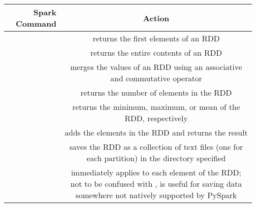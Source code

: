 \begin{table}[H]
\begin{tabular}{|r|C|}
\hline
\textbf{Spark Command} & \textbf{Action} \\
\hline
{} & returns the first  elements of an RDD \\
\hline
{} & returns the entire contents of an RDD \\
\hline
{} & merges the values of an RDD using an associative and commutative operator  \\
\hline
{} & returns the number of elements in the RDD \\
\hline
{} & returns the minimum, maximum, or mean of the RDD, respectively \\
\hline
{} & adds the elements in the RDD and returns the result \\
\hline
{} & saves the RDD as a collection of text files (one for each partition) in the directory specified \\
\hline
{} & immediately applies  to each element of the RDD; not to be confused with ,  is useful for saving data somewhere not natively supported by PySpark \\
\hline
\end{tabular}
\end{table}


